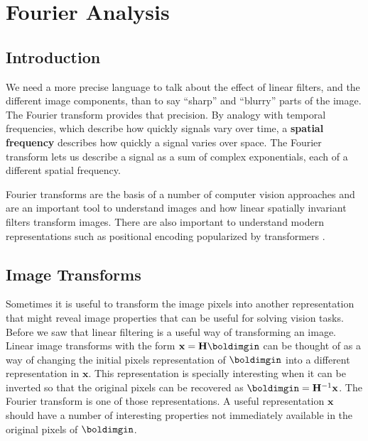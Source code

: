 \chapter{Fourier Analysis}
\label{chapter:fourier_analysis}


\section{Introduction}

We need a more precise language to talk about the effect of
linear filters, and the different image components, than to say
``sharp'' and ``blurry'' parts of the image.    The Fourier transform
provides that precision. By analogy with temporal frequencies, which describe how quickly signals vary over time,
a {\bf spatial frequency} describes how quickly a signal varies over space.
The Fourier transform lets us describe a signal as a sum of complex
exponentials, each of a different spatial frequency.

Fourier transforms are the basis of a number of computer vision approaches and are an important tool to understand images and how linear spatially invariant filters transform images. There are also important to understand modern representations such as positional encoding popularized by transformers \cite{vaswani2017attention}. 

\section{Image Transforms}

Sometimes it is useful to transform the image pixels into another representation that might reveal image properties that can be useful for solving vision tasks. Before we saw that linear filtering is a useful way of transforming an image. Linear image transforms with the form $\mathbf{x} =  \mathbf{H} \boldimgin$ can be thought of as a way of changing the initial pixels representation of $\boldimgin$ into a different representation in $\mathbf{x}$. 
This representation is specially interesting when it  can  be inverted so that the original pixels can be recovered as $\boldimgin =  \mathbf{H}^{-1} \mathbf{x}$. The Fourier transform is one of those representations. A useful representation $\mathbf{x}$ should have a number of interesting properties not immediately available in the original pixels of $\boldimgin$. 




